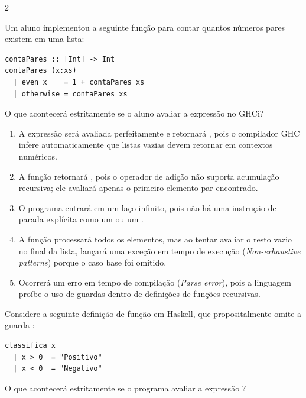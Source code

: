 \documentclass[a4paper,10pt,brazil]{article}
\begin{document}
\begin{multicols}{2}
\begin{enumerate}
\end{enumerate}

Um aluno implementou a seguinte função para contar quantos números pares existem em uma lista:

\begin{verbatim}
contaPares :: [Int] -> Int
contaPares (x:xs)
  | even x    = 1 + contaPares xs
  | otherwise = contaPares xs
\end{verbatim}

O que acontecerá estritamente se o aluno avaliar a expressão  no GHCi?

\begin{enumerate}
  \item A expressão será avaliada perfeitamente e retornará , pois o compilador GHC infere automaticamente que listas vazias devem retornar  em contextos numéricos.

  \item A função retornará , pois o operador de adição não suporta acumulação recursiva; ele avaliará apenas o primeiro elemento par encontrado.

  \item O programa entrará em um laço infinito, pois não há uma instrução de parada explícita como um  ou um .

  \item A função processará todos os elementos, mas ao tentar avaliar o resto vazio no final da lista, lançará uma exceção em tempo de execução (\emph{Non-exhaustive patterns}) porque o caso base  foi omitido.

  \item Ocorrerá um erro em tempo de compilação (\emph{Parse error}), pois a linguagem proíbe o uso de guardas dentro de definições de funções recursivas.


\end{enumerate}

Considere a seguinte definição de função em Haskell, que propositalmente omite a guarda :

\begin{verbatim}
classifica x
  | x > 0  = "Positivo"
  | x < 0  = "Negativo"
\end{verbatim}

O que acontecerá estritamente se o programa avaliar a expressão ?


\end{multicols}
\end{document}
